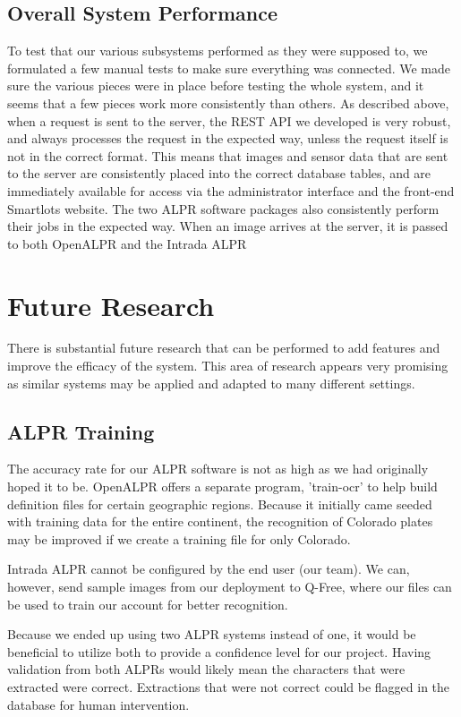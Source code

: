 \documentclass[11pt, oneside, fullpage, doublespace]{article}
\begin{document}
\subsection{Overall System Performance}
To test that our various subsystems performed as they were supposed to, we formulated a few manual tests to make sure everything was connected. We made sure the various pieces were in place before testing the whole system, and it seems that a few pieces work more consistently than others. As described above, when a request is sent to the server, the REST API we developed is very robust, and always processes the request in the expected way, unless the request itself is not in the correct format. This means that images and sensor data that are sent to the server are consistently placed into the correct database tables, and are immediately available for access via the administrator interface and the front-end Smartlots website. The two ALPR software packages also consistently perform their jobs in the expected way. When an image arrives at the server, it is passed to both OpenALPR and the Intrada ALPR

\section{Future Research}
There is substantial future research that can be performed to add features and improve the efficacy of the system. This area of research appears very promising as similar systems may be applied and adapted to many different settings.

\subsection{ALPR Training}
The accuracy rate for our ALPR software is not as high as we had originally hoped it to be. OpenALPR offers a separate program, 'train-ocr' to help build definition files for certain geographic regions. Because it initially came seeded with training data for the entire continent, the recognition of Colorado plates may be improved if we create a training file for only Colorado.

Intrada ALPR cannot be configured by the end user (our team). We can, however, send sample images from our deployment to Q-Free, where our files can be used to train our account for better recognition.

Because we ended up using two ALPR systems instead of one, it would be beneficial to utilize both to provide a confidence level for our project. Having validation from both ALPRs would likely mean the characters that were extracted were correct. Extractions that were not correct could be flagged in the database for human intervention.
\end{document}
